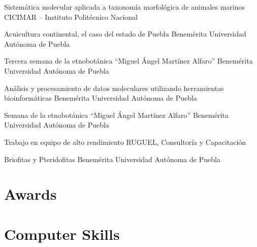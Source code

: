 \documentclass[10pt, letterpaper, roman]{moderncv}
\begin{document}
		{Sistemática molecular aplicada a taxonomía morfológica de animales 
		marinos}
		{\newline CICIMAR -- Instituto Politécnico Nacional}
		{}
		{}
		{}

		{Acuicultura continental, el caso del estado de Puebla}
		{\newline Benemérita Universidad Autónoma de Puebla}
		{}
		{}
		{}

		{Tercera semana de la etnobotánica ``Miguel Ángel Martínez Alfaro''}
		{\newline Benemérita Universidad Autónoma de Puebla}
		{}
		{}
		{}

		{Análisis y procesamiento de datos moleculares utilizando herramientas 
		bioinformáticas}
		{\newline Benemérita Universidad Autónoma de Puebla}
		{}
		{}
		{}

		{Semana de la etnobotánica ``Miguel Ángel Martínez Alfaro''}
		{\newline Benemérita Universidad Autónoma de Puebla}
		{}
		{}
		{}

		{Trabajo en equipo de alto rendimiento}
		{\newline RUGUEL, Consultoría y Capacitación}
		{}
		{}
		{}

		{Briofitas y Pteridofitas}
		{\newline Benemérita Universidad Autónoma de Puebla}
		{}
		{}
		{}


\section{Awards}



\section{Computer Skills}
\end{document}
